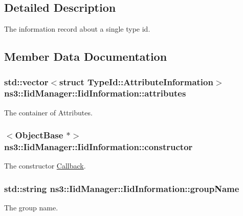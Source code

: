 \subsection{Detailed Description}
The information record about a single type id. 

\subsection{Member Data Documentation}
\subsubsection[{\texorpdfstring{attributes}{attributes}}]{\setlength{\rightskip}{0pt plus 5cm}std\+::vector$<$struct {\bf Type\+Id\+::\+Attribute\+Information}$>$ ns3\+::\+Iid\+Manager\+::\+Iid\+Information\+::attributes}\hypertarget{structns3_1_1IidManager_1_1IidInformation_a4ba890d012d1abc962f339e18eb9050c}{}\label{structns3_1_1IidManager_1_1IidInformation_a4ba890d012d1abc962f339e18eb9050c}
The container of Attributes. 
\subsubsection[{\texorpdfstring{constructor}{constructor}}]{$<${\bf Object\+Base} $\ast$$>$ ns3\+::\+Iid\+Manager\+::\+Iid\+Information\+::constructor}\hypertarget{structns3_1_1IidManager_1_1IidInformation_a7217a19e81767b4b685d0c7bae02764d}{}\label{structns3_1_1IidManager_1_1IidInformation_a7217a19e81767b4b685d0c7bae02764d}
The constructor \hyperlink{classns3_1_1Callback}{Callback}. 
\subsubsection[{\texorpdfstring{group\+Name}{groupName}}]{\setlength{\rightskip}{0pt plus 5cm}std\+::string ns3\+::\+Iid\+Manager\+::\+Iid\+Information\+::group\+Name}\hypertarget{structns3_1_1IidManager_1_1IidInformation_a096dd5f8414ab8077de95bfbeb039073}{}\label{structns3_1_1IidManager_1_1IidInformation_a096dd5f8414ab8077de95bfbeb039073}
The group name. 
